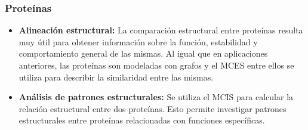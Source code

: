 \subsubsection{Proteínas}

\begin{itemize}
\item \textbf{Alineación estructural:}
La comparación estructural entre proteínas resulta muy útil para obtener información sobre la función, estabilidad y comportamiento general de las mismas. Al igual que en aplicaciones anteriores, las proteínas son modeladas con grafos y el MCES entre ellos se utiliza para describir la similaridad entre las mismas.

\item \textbf{Análisis de patrones estructurales:}
Se utiliza el MCIS para calcular la relación estructural entre dos proteínas. Esto permite investigar patrones estructurales entre proteínas relacionadas con funciones específicas.

\end{itemize}





